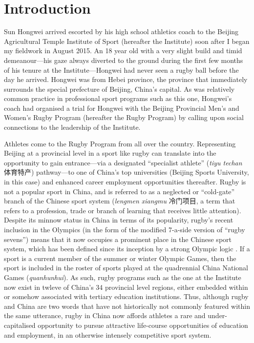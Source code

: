 

\chapter{\label{introduction}Introduction}

\minitoc
Sun Hongwei arrived escorted by his high school athletics coach to the Beijing Agricultural Temple Institute of Sport (hereafter the Institute) soon after I began my fieldwork in August 2015.  An 18 year old with a very slight build and timid demeanour---his gaze always diverted to the ground during the first few months of his tenure at the Institute---Hongwei had never seen a rugby ball before the day he arrived.
Hongwei was from Hebei province, the province that immediately surrounds the special prefecture of Beijing, China's capital.  As was relatively common practice in professional sport programs such as this one, Hongwei's coach had organised a trial for Hongwei with the Beijing Provincial Men’s and Women's Rugby Program (hereafter the Rugby Program) by calling upon social connections to the leadership of the Institute.

Athletes come to the Rugby Program from all over the country.  Representing Beijing at a provincial level in a sport like rugby can translate into the opportunity to gain entrance---via a designated ``specialist athlete'' (\textit{tiyu techan} 体育特产) pathway---to one of
China's top universities (Beijing Sports University, in this case) and enhanced career employment opportunities thereafter.  Rugby is not a popular sport in China, and is referred to as a neglected or ``cold-gate'' branch of the Chinese sport system (\textit{lengmen xiangmu} 冷门项目, a term that refers to a profession, trade or branch of learning that receives little attention). Despite its minnow status in China in terms of its popularity, rugby's recent inclusion in the Olympics (in the form of the modified 7-a-side version of ``rugby sevens'') means that it now occupies a prominent place in the Chinese sport system, which has been defined since its inception by a strong Olympic logic \citep{Brownell2008}.  If a sport is a current member of the summer or winter Olympic Games, then the sport is included in the roster of sports played at the quadrennial China National Games (\textit{quanhunhui}). As such, rugby programs such as the one at the Institute now exist in twleve of China's 34 provincial level regions, either embedded within or somehow associated with tertiary education institutions. Thus, although rugby and China are two words that have not historically not commonly featured within the same utterance, rugby in China now affords athletes a rare and under-capitalised opportunity to pursue attractive life-course opportunities of education and employment, in an otherwise intensely competitive sport system.

